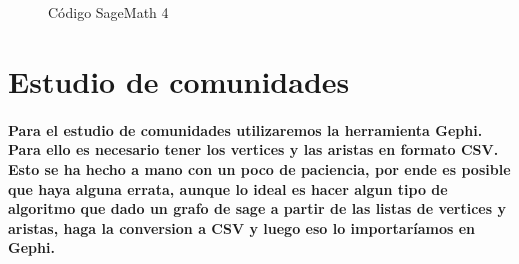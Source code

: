 \documentclass[11pt,spanish]{article}
\begin{document}
\begin{figure}[H]
	\begin{center}
%
	   \\%
	   \\ %
%
	\end{center}
	\caption{%
	Código SageMath 4
 	}%
	\label{fig:codigoSage4}
\end{figure}


\section{Estudio de comunidades}
\paragraph*{Para el estudio de comunidades utilizaremos la herramienta Gephi. 
Para ello es necesario tener los vertices y las aristas en formato CSV.
Esto se ha hecho a mano con un poco de paciencia, por ende es posible que haya alguna errata, 
aunque lo ideal es hacer algun tipo de algoritmo que dado un grafo de sage  a partir de las listas de vertices y aristas,
haga la conversion a CSV y luego eso lo importaríamos en Gephi.}
\end{document}
